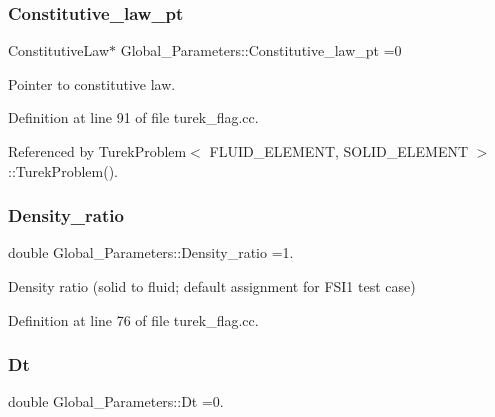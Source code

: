 \mbox{\label{namespaceGlobal__Parameters_adbd1f040f375c96fe56b3f475f7dbec2}} 
\subsubsection{\texorpdfstring{Constitutive\+\_\+law\+\_\+pt}{Constitutive\_law\_pt}}
{\footnotesize\ttfamily Constitutive\+Law$\ast$ Global\+\_\+\+Parameters\+::\+Constitutive\+\_\+law\+\_\+pt =0}



Pointer to constitutive law. 



Definition at line 91 of file turek\+\_\+flag.\+cc.



Referenced by Turek\+Problem$<$ F\+L\+U\+I\+D\+\_\+\+E\+L\+E\+M\+E\+N\+T, S\+O\+L\+I\+D\+\_\+\+E\+L\+E\+M\+E\+N\+T $>$\+::\+Turek\+Problem().

\mbox{\label{namespaceGlobal__Parameters_a517d4c31b8bce6563c2f605266dd9679}} 
\subsubsection{\texorpdfstring{Density\+\_\+ratio}{Density\_ratio}}
{\footnotesize\ttfamily double Global\+\_\+\+Parameters\+::\+Density\+\_\+ratio =1.}



Density ratio (solid to fluid; default assignment for F\+S\+I1 test case) 



Definition at line 76 of file turek\+\_\+flag.\+cc.

\mbox{\label{namespaceGlobal__Parameters_ab29c9f716872de235c78e62bce2c4109}} 
\subsubsection{\texorpdfstring{Dt}{Dt}}
{\footnotesize\ttfamily double Global\+\_\+\+Parameters\+::\+Dt =0.}



